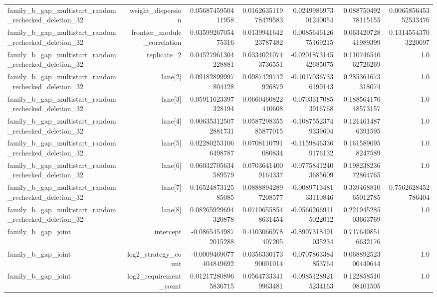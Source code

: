 {\begin{longtable}{lrrrrrr}
family\_b\_gap\_multistart\_random\_rechecked\_deletion\_32 & weight\_dispersion & 0.0568745950411958 & 0.016263511978479583 & 0.024998697301240054 & 0.08875049278115155 & 0.006585645352533476 \\
family\_b\_gap\_multistart\_random\_rechecked\_deletion\_32 & frontier\_module\_correlation & 0.0359926705475316 & 0.013994164223787482 & 0.008564612675169215 & 0.06342072841989399 & 0.13145543703220697 \\
family\_b\_gap\_multistart\_random\_rechecked\_deletion\_32 & replicate\_2 & 0.04527961304228881 & 0.03340210743736551 & -0.020187314542685075 & 0.11074654062726269 & 1.0 \\
family\_b\_gap\_multistart\_random\_rechecked\_deletion\_32 & lane[2] & 0.09182899997804128 & 0.0987429742926879 & -0.10170367336199143 & 0.285361673318074 & 1.0 \\
family\_b\_gap\_multistart\_random\_rechecked\_deletion\_32 & lane[3] & 0.05911623397328194 & 0.0660460822410608 & -0.07033170853916768 & 0.18856417648573157 & 1.0 \\
family\_b\_gap\_multistart\_random\_rechecked\_deletion\_32 & lane[4] & 0.006353125072881731 & 0.058729835585877015 & -0.10875523749339604 & 0.1214614876391595 & 1.0 \\
family\_b\_gap\_multistart\_random\_rechecked\_deletion\_32 & lane[5] & 0.022802531066498787 & 0.0708110791080834 & -0.11598463369176132 & 0.1615896958247589 & 1.0 \\
family\_b\_gap\_multistart\_random\_rechecked\_deletion\_32 & lane[6] & 0.06032705634589579 & 0.07036414009164337 & -0.07758412403685609 & 0.19823823672864765 & 1.0 \\
family\_b\_gap\_multistart\_random\_rechecked\_deletion\_32 & lane[7] & 0.1652487312585085 & 0.08888942897208577 & -0.008971348133110846 & 0.33946881065012785 & 0.7562628452786404 \\
family\_b\_gap\_multistart\_random\_rechecked\_deletion\_32 & lane[8] & 0.08265929694320878 & 0.07106558548631454 & -0.05662669115022012 & 0.22194528503663769 & 1.0 \\
family\_b\_gap\_joint & intercept & -0.08654549872015288 & 0.4103066978407205 & -0.8907318491035234 & 0.7176408516632176 &  \\
family\_b\_gap\_joint & log2\_strategy\_count & -0.0009469077404849692 & 0.035633017390001014 & -0.0707863384853764 & 0.06889252300440644 & 1.0 \\
family\_b\_gap\_joint & log2\_requirement\_count & 0.012172808965836715 & 0.05647333419963481 & -0.09851289215234163 & 0.12285851008401505 & 1.0 \\

\end{longtable}}
